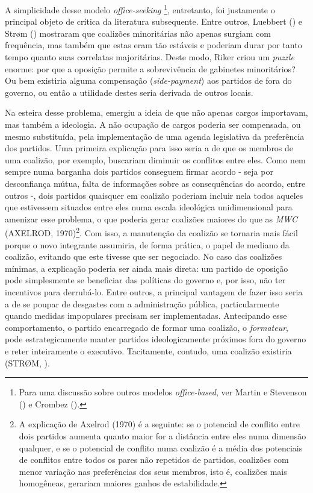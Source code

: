 A simplicidade desse modelo \textit{office-seeking} \footnote{Para uma discussão sobre outros modelos \textit{office-based}, ver Martin e Stevenson (\citeyear{martin2001}) e Crombez (\citeyear{crombez1996}).}, entretanto, foi justamente o principal objeto de crítica da literatura subsequente. Entre outros, Luebbert (\citeyear{luebbert1986}) e Str\o{}m (\citeyear{strom1990}) mostraram que coalizões minoritárias não apenas surgiam com frequência, mas também que estas eram tão estáveis e poderiam durar por tanto tempo quanto suas correlatas majoritárias. Deste modo, Riker criou um \textit{puzzle} enorme: por que a oposição permite a sobrevivência de gabinetes minoritários? Ou bem existiria alguma compensação (\textit{side-payment}) aos partidos de fora do governo, ou então a utilidade destes seria derivada de outros locais.
 
Na esteira desse problema, emergiu a ideia de que não apenas cargos importavam, mas também a ideologia. A não ocupação de cargos poderia ser compensada, ou mesmo substituída, pela implementação de uma agenda legislativa da preferência dos partidos. Uma primeira explicação para isso seria a de que os membros de uma coalizão, por exemplo, buscariam diminuir os conflitos entre eles. Como nem sempre numa barganha dois partidos conseguem firmar acordo - seja por desconfiança mútua, falta de informações sobre as consequências do acordo, entre outros -, dois partidos quaisquer em coalizão poderiam incluir nela todos aqueles que estivessem situados entre eles numa escala ideológica unidimensional para amenizar esse problema, o que poderia gerar coalizões maiores do que as \textit{MWC} (AXELROD, 1970)\footnote{A explicação de Axelrod (1970) é a seguinte: se o potencial de conflito entre dois partidos aumenta quanto maior for a distância entre eles numa dimensão qualquer, e se o potencial de conflito numa coalizão é a média dos potenciais de conflitos entre todos os pares não repetidos de partidos, coalizões com menor variação nas preferências dos seus membros, isto é, coalizões mais homogêneas, gerariam maiores ganhos de estabilidade.}. Com isso, a manutenção da coalizão se tornaria mais fácil porque o novo integrante assumiria, de forma prática, o papel de mediano da coalizão, evitando que este tivesse que ser negociado. No caso das coalizões mínimas, a explicação poderia ser ainda mais direta: um partido de oposição pode simplesmente se beneficiar das políticas do governo e, por isso, não ter incentivos para derrubá-lo. Entre outros, a principal vantagem de fazer isso seria a de se poupar de desgastes com a administração pública, particularmente quando medidas impopulares precisam ser implementadas. Antecipando esse comportamento, o partido encarregado de formar uma coalizão, o \textit{formateur}, pode estrategicamente manter partidos ideologicamente próximos fora do governo e reter inteiramente o executivo. Tacitamente, contudo, uma coalizão existiria (STR\O{}M, \citeyear{strom1990}).

